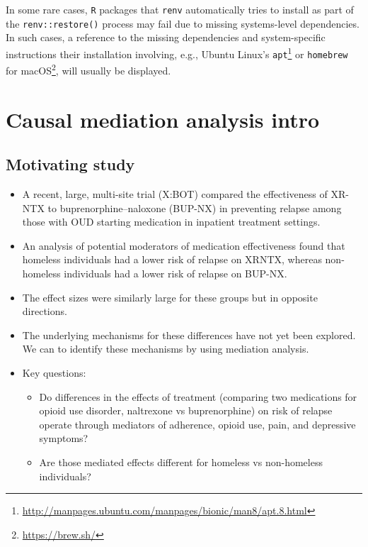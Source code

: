 \documentclass[
  12pt,
]{book}
\newcommand{\passthrough}[1]{#1}
\providecommand{\tightlist}{%
  \setlength{\itemsep}{0pt}\setlength{\parskip}{0pt}}
\renewcommand{\href}[2]{#2\footnote{\url{#1}}}
\theoremstyle{definition}
\theoremstyle{definition}
\theoremstyle{definition}
\newcommand{\1}{\mathbbm{1}}
\begin{document}
In some rare cases, \passthrough{\lstinline!R!} packages that \passthrough{\lstinline!renv!} automatically tries to install as
part of the \passthrough{\lstinline!renv::restore()!} process may fail due to missing systems-level
dependencies. In such cases, a reference to the missing dependencies and
system-specific instructions their installation involving, e.g., \href{http://manpages.ubuntu.com/manpages/bionic/man8/apt.8.html}{Ubuntu
Linux's \passthrough{\lstinline!apt!}} or
\href{https://brew.sh/}{\passthrough{\lstinline!homebrew!} for macOS}, will usually be displayed.

\hypertarget{mediation}{%
\chapter{Causal mediation analysis intro}\label{mediation}}

\hypertarget{motivating-study}{%
\section{Motivating study}\label{motivating-study}}

\begin{itemize}
\item
  A recent, large, multi-site trial (X:BOT) compared the effectiveness of XR-NTX
  to buprenorphine--naloxone (BUP-NX) in preventing relapse among those with OUD
  starting medication in inpatient treatment settings.
\item
  An analysis of potential moderators of medication effectiveness found that
  homeless individuals had a lower risk of relapse on XRNTX, whereas
  non-homeless individuals had a lower risk of relapse on BUP-NX.
\item
  The effect sizes were similarly large for these groups but in opposite
  directions.
\item
  The underlying mechanisms for these differences have not yet been explored. We
  can to identify these mechanisms by using mediation analysis.
\item
  Key questions:

  \begin{itemize}
  \tightlist
  \item
    Do differences in the effects of treatment (comparing two medications for
    opioid use disorder, naltrexone vs buprenorphine) on risk of relapse operate
    through mediators of adherence, opioid use, pain, and depressive symptoms?
    \citep{rudolph2020explaining}
  \item
    Are those mediated effects different for homeless vs non-homeless
    individuals?
  \end{itemize}
\end{itemize}
\end{document}
